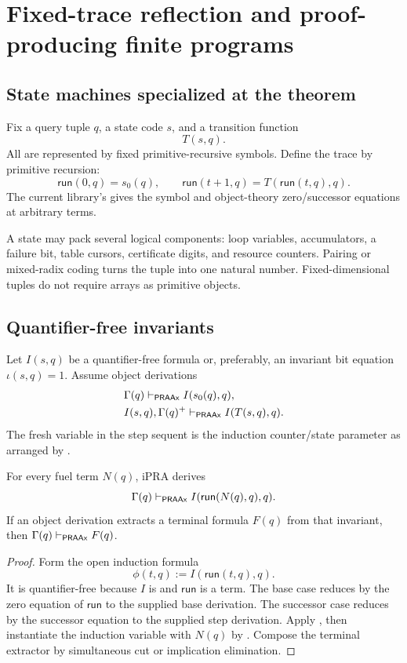 \section{Fixed-trace reflection and proof-producing finite programs}
\label{sec:trace}

\subsection{State machines specialized at the theorem}

Fix a query tuple \(q\), a state code \(s\), and a transition function
\[
  T(s,q).
\]
All are represented by fixed primitive-recursive symbols.  Define the trace by primitive recursion:
\[
  \mathsf{run}(0,q)=s_0(q),
  \qquad
  \mathsf{run}(t+1,q)=T(\mathsf{run}(t,q),q).
\]
The current library's  gives the symbol and object-theory zero/successor equations at arbitrary terms.

A state may pack several logical components: loop variables, accumulators, a failure bit, table cursors, certificate digits, and resource counters.  Pairing or mixed-radix coding turns the tuple into one natural number.  Fixed-dimensional tuples do not require arrays as primitive objects.

\subsection{Quantifier-free invariants}

Let \(I(s,q)\) be a quantifier-free formula or, preferably, an invariant bit equation \(\iota(s,q)=1\).  Assume object derivations
\[
\begin{aligned}
&\Gamma(q)\vdash_{\mathsf{PRAAx}} I(s_0(q),q),\\
&I(s,q),\Gamma(q)^{+}\vdash_{\mathsf{PRAAx}} I(T(s,q),q).
\end{aligned}
\]
The fresh variable in the step sequent is the induction counter/state parameter as arranged by .

\begin{theorem}
\label{thm:trace-reflection}
For every fuel term \(N(q)\), iPRA derives
\[
  \Gamma(q)\vdash_{\mathsf{PRAAx}} I(\mathsf{run}(N(q),q),q).
\]
If an object derivation extracts a terminal formula \(F(q)\) from that invariant, then \(\Gamma(q)\vdash_{\mathsf{PRAAx}}F(q)\).
\end{theorem}
\begin{proof}
Form the open induction formula
\[
  \phi(t,q):=I(\mathsf{run}(t,q),q).
\]
It is quantifier-free because \(I\) is and \(\mathsf{run}\) is a term.  The base case reduces by the zero equation of \(\mathsf{run}\) to the supplied base derivation.  The successor case reduces by the successor equation to the supplied step derivation.  Apply , then instantiate the induction variable with \(N(q)\) by .  Compose the terminal extractor by simultaneous cut or implication elimination.
\end{proof}

